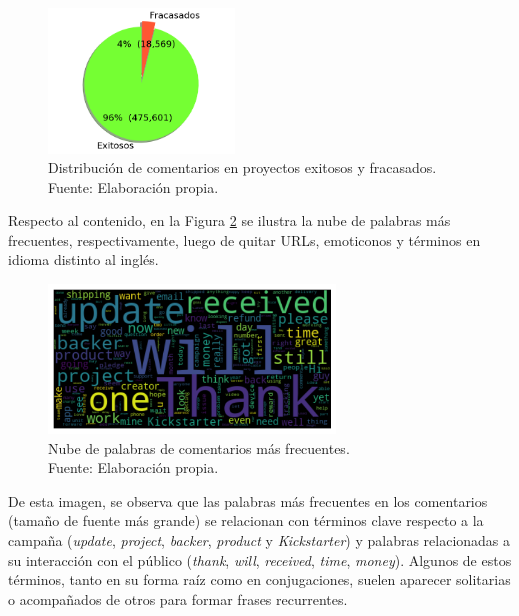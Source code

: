 \begin{figure}[!ht]
	\begin{center}
		\includegraphics[width=0.44\textwidth]{4/figures/total comments by projects state.png}
		\caption[Distribución de comentarios en proyectos exitosos y fracasados]{Distribución de comentarios en proyectos exitosos y fracasados.\\
			Fuente: Elaboración propia.}
		\label{4:fig25}
	\end{center}
\end{figure}

Respecto al contenido, en la Figura \ref{4:fig26} se ilustra la nube de palabras más frecuentes, respectivamente, luego de quitar URLs, emoticonos y términos en idioma distinto al inglés.

\begin{figure}[htbp]
	\begin{center}
		\includegraphics[width=0.68\textwidth]{4/figures/comments_wordcloud_wordunit.png}
		\caption[Nube de palabras de comentarios más frecuentes]{Nube de palabras de comentarios más frecuentes.\\
			Fuente: Elaboración propia.}
		\label{4:fig26}
	\end{center}
\end{figure}

De esta imagen, se observa que las palabras más frecuentes en los comentarios (tamaño de fuente más grande) se relacionan con términos clave respecto a la campaña (\textit{update}, \textit{project}, \textit{backer}, \textit{product} y \textit{Kickstarter}) y palabras relacionadas a su interacción con el público (\textit{thank}, \textit{will}, \textit{received}, \textit{time}, \textit{money}). Algunos de estos términos, tanto en su forma raíz como en conjugaciones, suelen aparecer solitarias o acompañados de otros para formar frases recurrentes.

